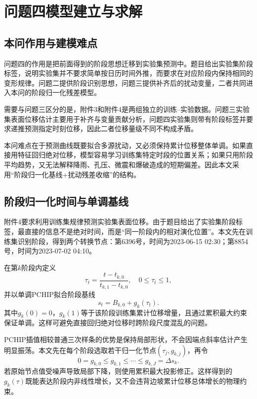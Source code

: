 \chapter{问题四模型建立与求解}

\section{本问作用与建模难点}

问题四的作用是把前面得到的阶段思想迁移到实验集预测中。题目给出实验集阶段标签，说明实验集并不要求简单按日历时间外推，而要求在对应阶段内保持相同的变形规律。问题二提供阶段识别思想，问题三提供补齐后的扰动变量，二者共同进入本问的阶段归一化残差模型。

需要与问题三区分的是，附件3和附件4是两组独立的训练--实验数据。问题三实验集表面位移估计主要用于补齐与变量贡献分析，问题四实验集则带有阶段标签并要求递推预测指定时刻位移，因此二者位移量级不同不构成矛盾。

本问难点在于预测曲线既要拟合多源扰动，又必须保持累计位移整体单调。如果直接用特征回归绝对位移，模型容易学习训练集特定时段的位置关系；如果只用阶段平均趋势，又无法解释降雨、孔压、微震和爆破造成的短期偏差。因此本文采用“阶段归一化基线+扰动残差收缩”的结构。

\section{阶段归一化时间与单调基线}

附件4要求利用训练集规律预测实验集表面位移。由于题目给出了实验集阶段标签，最直接的信息不是绝对时间，而是“同一阶段内的相对演化位置”。本文先在训练集识别阶段，得到两个转换节点：第6396号，时间为2023-06-15 02:30；第8854号，时间为2023-07-02 04:10。

在第$k$阶段内定义
\begin{equation}
  \tau_t=\frac{t-t_{k,0}}{t_{k,1}-t_{k,0}},\quad 0\leq \tau_t\leq 1,
\end{equation}
并以单调PCHIP拟合阶段基线
\begin{equation}
  s_t=B_{k,0}+g_k(\tau_t).
\end{equation}
其中$g_k(0)=0$，$g_k(1)$等于该阶段训练集累计位移增量，且通过累积最大约束保证单调。这样可避免直接回归绝对位移时跨阶段尺度混乱的问题。

PCHIP插值相较普通三次样条的优势是保持局部形状，不会因端点斜率估计产生明显振荡。本文先在每个阶段选取若干归一化节点$(\tau_j,g_{k,j})$，再令
\begin{equation}
  0=g_{k,0}\leq g_{k,1}\leq\cdots\leq g_{k,J}=\Delta s_k .
\end{equation}
若原始节点值受噪声导致局部下降，则使用累积最大投影修正。这样得到的$g_k(\tau)$既能表达阶段内非线性增长，又不会违背边坡累计位移总体增长的物理约束。

